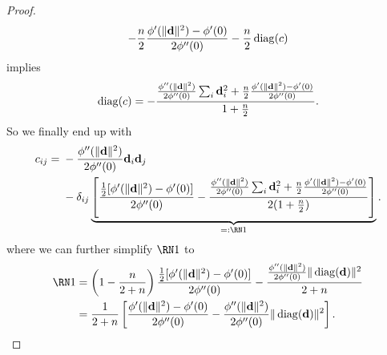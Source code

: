 \begin{proof}
\begin{equation*}
		- \frac{n}2\frac{\phi'(\|\mathbf{d}\|^2) - \phi'(0)}{2\phi''(0)}
		- \frac{n}2 \operatorname{diag}(c)
	\end{equation*}
	implies
	\begin{equation*}
		\operatorname{diag}(c)
		= - \frac{
			\frac{\phi''(\|\mathbf{d}\|^2)}{2\phi''(0)}\sum_{i}\mathbf{d}_i^2
			+ \frac{n}2\frac{\phi'(\|\mathbf{d}\|^2) - \phi'(0)}{2\phi''(0)}
		}{1+\frac{n}2}.
	\end{equation*}
	So we finally end up with
	\begin{equation*}
		c_{ij} =
		\begin{aligned}[t]
			&- \frac{\phi''(\|\step\|^2)}{2\phi''(0)}\step_i\step_j\\
			&- \delta_{ij}\underbrace{\left[
			\frac{\tfrac12[\phi'(\|\step\|^2)-\phi'(0)]}{2\phi''(0)}
			- \frac{
				\frac{\phi''(\|\step\|^2)}{2\phi''(0)}\sum_{i}\step_i^2
				+ \frac{n}2\frac{\phi'(\|\step\|^2) - \phi'(0)}{2\phi''(0)}
			}{2(1+\frac{n}2)}
			\right]}_{=:\Rom{1}}.
		\end{aligned}
	\end{equation*}
	where we can further simplify \(\Rom{1}\) to
	\begin{align*}
		\Rom{1}
		&= 
		\left(1- \frac{n}{2+n}\right)\frac{\tfrac12[\phi'(\|\step\|^2)-\phi'(0)]}{2\phi''(0)}
		- \frac{
			\frac{\phi''(\|\step\|^2)}{2\phi''(0)}\|\diag(\step)\|^2
		}{2+n}\\
		&= \frac1{2+n}\left[
		\frac{\phi'(\|\step\|^2)-\phi'(0)}{2\phi''(0)}
		-
			\frac{\phi''(\|\step\|^2)}{2\phi''(0)}\|\diag(\step)\|^2
		\right].
		\qedhere
	\end{align*}
\end{proof}
